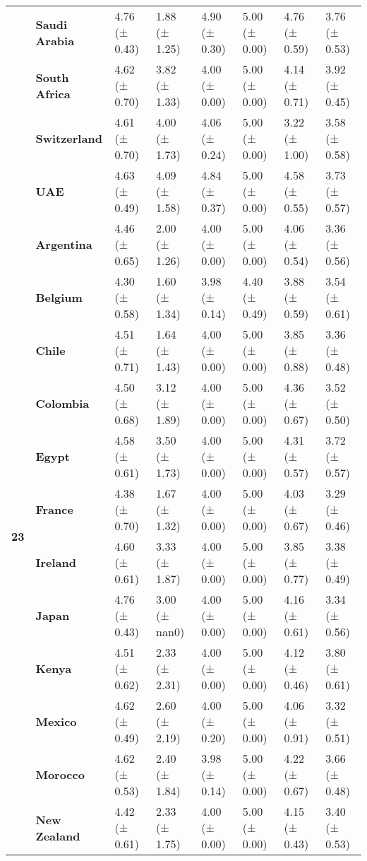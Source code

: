 \begin{tabular}{llllllll}
\textbf{} & \textbf{Saudi Arabia} & 4.76 (± 0.43) & 1.88 (± 1.25) & 4.90 (± 0.30) & 5.00 (± 0.00) & 4.76 (± 0.59) & 3.76 (± 0.53) \\
\textbf{} & \textbf{South Africa} & 4.62 (± 0.70) & 3.82 (± 1.33) & 4.00 (± 0.00) & 5.00 (± 0.00) & 4.14 (± 0.71) & 3.92 (± 0.45) \\
\textbf{} & \textbf{Switzerland} & 4.61 (± 0.70) & 4.00 (± 1.73) & 4.06 (± 0.24) & 5.00 (± 0.00) & 3.22 (± 1.00) & 3.58 (± 0.58) \\
\textbf{} & \textbf{UAE} & 4.63 (± 0.49) & 4.09 (± 1.58) & 4.84 (± 0.37) & 5.00 (± 0.00) & 4.58 (± 0.55) & 3.73 (± 0.57) \\
\cline{1-8}
\multirow[t]{19}{*}{\textbf{23}} & \textbf{Argentina} & 4.46 (± 0.65) & 2.00 (± 1.26) & 4.00 (± 0.00) & 5.00 (± 0.00) & 4.06 (± 0.54) & 3.36 (± 0.56) \\
\textbf{} & \textbf{Belgium} & 4.30 (± 0.58) & 1.60 (± 1.34) & 3.98 (± 0.14) & 4.40 (± 0.49) & 3.88 (± 0.59) & 3.54 (± 0.61) \\
\textbf{} & \textbf{Chile} & 4.51 (± 0.71) & 1.64 (± 1.43) & 4.00 (± 0.00) & 5.00 (± 0.00) & 3.85 (± 0.88) & 3.36 (± 0.48) \\
\textbf{} & \textbf{Colombia} & 4.50 (± 0.68) & 3.12 (± 1.89) & 4.00 (± 0.00) & 5.00 (± 0.00) & 4.36 (± 0.67) & 3.52 (± 0.50) \\
\textbf{} & \textbf{Egypt} & 4.58 (± 0.61) & 3.50 (± 1.73) & 4.00 (± 0.00) & 5.00 (± 0.00) & 4.31 (± 0.57) & 3.72 (± 0.57) \\
\textbf{} & \textbf{France} & 4.38 (± 0.70) & 1.67 (± 1.32) & 4.00 (± 0.00) & 5.00 (± 0.00) & 4.03 (± 0.67) & 3.29 (± 0.46) \\
\textbf{} & \textbf{Ireland} & 4.60 (± 0.61) & 3.33 (± 1.87) & 4.00 (± 0.00) & 5.00 (± 0.00) & 3.85 (± 0.77) & 3.38 (± 0.49) \\
\textbf{} & \textbf{Japan} & 4.76 (± 0.43) & 3.00 (± nan0) & 4.00 (± 0.00) & 5.00 (± 0.00) & 4.16 (± 0.61) & 3.34 (± 0.56) \\
\textbf{} & \textbf{Kenya} & 4.51 (± 0.62) & 2.33 (± 2.31) & 4.00 (± 0.00) & 5.00 (± 0.00) & 4.12 (± 0.46) & 3.80 (± 0.61) \\
\textbf{} & \textbf{Mexico} & 4.62 (± 0.49) & 2.60 (± 2.19) & 4.00 (± 0.20) & 5.00 (± 0.00) & 4.06 (± 0.91) & 3.32 (± 0.51) \\
\textbf{} & \textbf{Morocco} & 4.62 (± 0.53) & 2.40 (± 1.84) & 3.98 (± 0.14) & 5.00 (± 0.00) & 4.22 (± 0.67) & 3.66 (± 0.48) \\
\textbf{} & \textbf{New Zealand} & 4.42 (± 0.61) & 2.33 (± 1.75) & 4.00 (± 0.00) & 5.00 (± 0.00) & 4.15 (± 0.43) & 3.40 (± 0.53) \\

\end{tabular}
